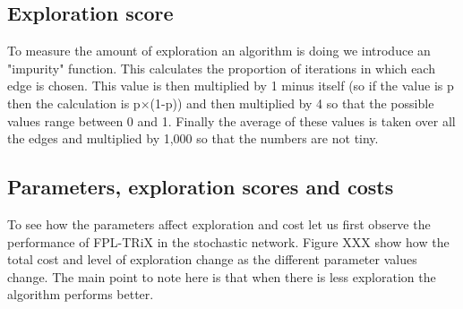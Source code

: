 \subsection{Exploration score}

To measure the amount of exploration an algorithm is doing we introduce an "impurity" function. This calculates the proportion of iterations in which each edge is chosen. This value is then multiplied by 1 minus itself (so if the value is p then the calculation is p$\times$(1-p)) and then multiplied by 4 so that the possible values range between 0 and 1. Finally the average of these values is taken over all the edges and multiplied by 1,000 so that the numbers are not tiny.\\

\subsection{Parameters, exploration scores and costs}

To see how the parameters affect exploration and cost let us first observe the performance of FPL-TRiX in the stochastic network. Figure XXX show how the total cost and level of exploration change as the different parameter values change. The main point to note here is that when there is less exploration the algorithm performs better.\\

